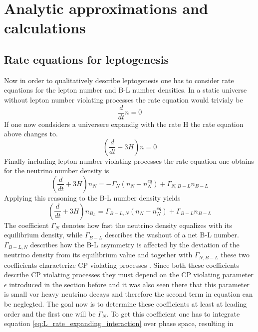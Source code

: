  \chapter{Analytic approximations and calculations}
\section{Rate equations for leptogenesis}
Now in order to qualitatively describe leptogenesis one has to consider rate equations for the lepton number and B-L number densities. In a static universe without lepton number violating processes the rate equation would trivialy be
\begin{equation}
	\frac{d}{dt}n=0
	\label{eq:rate_static_nointeraction}
\end{equation}
If one now condsiders a universere expandig with the rate H the rate equation above changes to.
\begin{equation}
\left(\frac{d}{dt}+3H\right)n=0
\label{eq:rate_expanding_nointeraction}
\end{equation}
Finally including lepton number violating processes the rate equation one obtains for the neutrino number density is
\begin{equation}
\left(\frac{d}{dt}+3H\right)n_N=-\Gamma_N\left(n_N-n_N^{eq}\right)+\Gamma_{N,B-L}n_{B-L}
\label{eq:L_rate_expanding_interaction}
\end{equation}
Applying this reasoning to the B-L number density yields
\begin{equation}
\left(\frac{d}{dt}+3H\right)n_{B_L}=\Gamma_{B-L,N}\left(n_N-n_N^{eq}\right)+\Gamma_{B-L}n_{B-L}
\label{eq:B-L_rate_expanding_interaction}
\end{equation}
The coefficient $\Gamma_N$ denotes how fast the neutrino density equalizes with its equilibrium density, while $\Gamma_{B-L}$ describes the washout of a net B-L number. $\Gamma_{B-L,N}$ describes how the B-L asymmetry is affected by the deviation of the neutrino density from its equilibrium value and together with $\Gamma_{N,B-L}$ these two coefficients characterize CP violating processes \cite[p. 4]{Bodeker:2013qaa}. Since both these coefficients describe CP violating processes they must depend on the CP violating parameter $\epsilon$ introduced in the section before and it was also seen there that this parameter is small vor heavy neutrino decays and therefore the second term in equation can be neglegted. \newline
The goal now is to determine these coefficients at least at leading order and the first one will be $\Gamma_N$. To get this coefficient one has to integrate equation \ref{eq:L_rate_expanding_interaction} over phase space, resulting in
